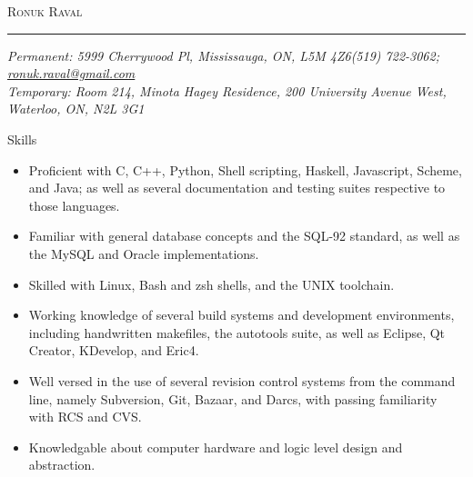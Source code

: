 \documentclass[11pt,oneside]{article}
\makeatletter
\newcommand{\name}{Ronuk Raval}
\newcommand{\permaddr}{5999 Cherrywood Pl, Mississauga, ON, L5M 4Z6}
\newcommand{\tempaddr}{
    Room 214,
    Minota Hagey Residence,
    200 University Avenue West,
    Waterloo, ON, N2L 3G1
}
\newcommand{\phone}{(519) 722-3062}
\newcommand{\email}{ronuk.raval@gmail.com}
\newcommand{\website}{http://zeroindexed.com}
\newcommand{\bigname}[1]{
    \begin{center}\fontfamily{phv}\selectfont\Huge\scshape#1\end{center}
}
\newcommand{\respara}[1]{
    \vspace{4pt}
    {\fontfamily{phv} \selectfont \Large #1} \\
    \vspace{4pt}
    \hspace{19pt}
}
\newenvironment{ressection}[1]{
    \respara{#1}
    \begin{itemize}
    \vspace{-20pt}
}{
    \end{itemize}
}
\newcommand{\resitem}[1]{
    \vspace{-4pt}
    \item \begin{flushleft} #1 \end{flushleft}
}
\makeatother
\begin{document}
 \selectfont

\bigname{\name}

\vspace{-8pt} \rule{\textwidth}{1pt}

\vspace{-1pt} {\small\itshape Permanent: \permaddr \hfill \phone; \href{mailto:\email}{\email}\\
    Temporary: \tempaddr}%

\vspace{8 pt}



\begin{ressection}{Skills}

    \resitem{Proficient with C, C++, Python, Shell scripting, Haskell,
        Javascript, Scheme, and Java; as well as several documentation and testing
        suites respective to those languages.}

    \resitem{Familiar with general database concepts and the SQL-92 standard, as well
        as the MySQL and Oracle implementations.}

    \resitem{Skilled with Linux, Bash and zsh shells, and the UNIX toolchain.}

    \resitem{Working knowledge of several build systems and development environments,
        including handwritten makefiles, the autotools suite, as well as Eclipse,
        Qt Creator, KDevelop, and Eric4.}

    \resitem{Well versed in the use of several revision control systems from the command
        line, namely Subversion, Git, Bazaar, and Darcs, with passing familiarity with
        RCS and CVS.}

    \resitem{Knowledgable about computer hardware and logic level design and abstraction.}

\end{ressection}
\end{document}
